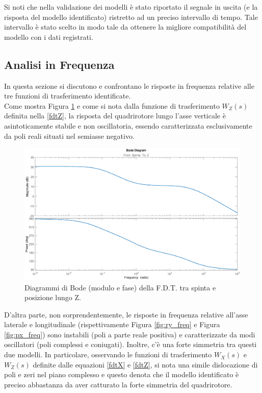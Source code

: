 Si noti che nella validazione dei modelli è stato riportato il segnale in uscita (e la risposta del modello identificato) ristretto ad un preciso intervallo di tempo. Tale intervallo è stato scelto in modo tale da ottenere la migliore compatibilità del modello con i dati registrati.

\pagebreak

\subsection{Analisi in Frequenza}
In questa sezione si discutono e confrontano le risposte in frequenza relative alle tre funzioni di trasferimento identificate.\\

Come mostra Figura \ref{fig:tz_freq} e come si nota dalla funzione di trasferimento $W_Z(s)$ definita nella \ref{fdtZ}, la risposta del quadrirotore lungo l'asse verticale è asintoticamente stabile e non oscillatoria, essendo caratterizzata esclusivamente da poli reali situati nel semiasse negativo.

\begin{figure}[H]
	\centering
	\includegraphics[width=1\textwidth]{gfx/SysId/tzbode}
	\caption[Diagrammi di Bode F.D.T. Spinta e posizione lungo Z.]{Diagrammi di Bode (modulo e fase) della F.D.T. tra spinta e posizione lungo Z.}
	\label{fig:tz_freq}
\end{figure}

D'altra parte, non sorprendentemente, le risposte in frequenza relative all'asse laterale e longitudinale (rispettivamente Figura \ref{fig:ry_freq} e Figura \ref{fig:px_freq}) sono instabili (poli a parte reale positiva) e caratterizzate da modi oscillatori (poli complessi e coniugati). Inoltre, c'è una forte simmetria tra questi due modelli. In particolare, osservando le funzioni di trasferimento $W_X(s)$ e $W_Z(s)$ definite dalle equazioni \ref{fdtX} e \ref{fdtZ}, si nota una simile dislocazione di poli e zeri nel piano complesso e questo denota che il modello identificato è preciso abbastanza da aver catturato la forte simmetria del quadrirotore.

